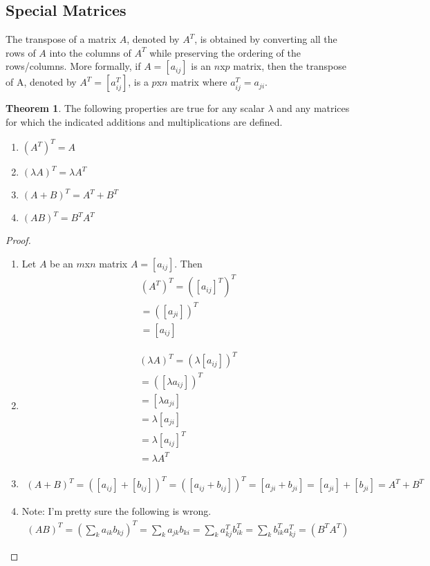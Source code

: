 \documentclass[11pt]{article}
\theoremstyle{definition}
\newtheorem{theorem}{Theorem}
\begin{document}
	\pagebreak
	\subsection{Special Matrices}
		The transpose of a matrix $A$, denoted by $A^T$, is obtained by converting all the rows of $A$ into the columns of $A^T$ while preserving the ordering of the rows/columns. More formally, if $A = [a_{ij}]$ is an $n$x$p$ matrix, then the transpose of A, denoted by $A^T = [a^T_{ij}]$, is a $p$x$n$ matrix where $a^T_{ij} = a_{ji}$.
		
		\begin{theorem}
			The following properties are true for any scalar $\lambda$ and any matrices for which the indicated additions and multiplications are defined.
			\begin{enumerate}[label=(\alph*)]
				\item $(A^T)^T = A$
				\item $(\lambda A)^T = \lambda A^T$
				\item $(A+B)^T = A^T + B^T$
				\item $(AB)^T = B^T A^T$
			\end{enumerate}
		\end{theorem}
		
		\begin{shaded}
			\begin{proof}
				\begin{enumerate}[label=(\alph*)]
					\item Let $A$ be an $m$x$n$ matrix $A=[a_{ij}]$. Then 
					\begin{align*}
					(A^T)^T = ([a_{ij}]^T)^T \\
					= ([a_{ji}])^T \\
					= [a_{ij}]
					\end{align*}
					
					\item 
					\begin{align*}
						(\lambda A)^T = (\lambda [a_{ij}])^T \\
						= ([\lambda a_{ij}])^T \\
						= [\lambda a_{ji}] \\
						= \lambda [a_{ji}] \\
						= \lambda [a_{ij}]^T \\
						= \lambda A^T
					\end{align*}
					
					\item
						\begin{align*}
							(A+B)^T = ([a_{ij}]+[b_{ij}])^T = ([a_{ij}+b_{ij}])^T = [a_{ji}+b_{ji}] = [a_{ji}]+[b_{ji}] = A^T + B^T
						\end{align*}
						
					\item Note: I'm pretty sure the following is wrong.
						\begin{align*}
							(AB)^T = (\sum_{k}a_{ik}b_{kj})^T = \sum_{k}a_{jk}b_{ki} = \sum_{k}a_{kj}^Tb_{ik}^T = \sum_{k}b_{ik}^Ta_{kj}^T = (B^TA^T)
						\end{align*}
				\end{enumerate}
			\end{proof}
		\end{shaded}
	
\end{document}
